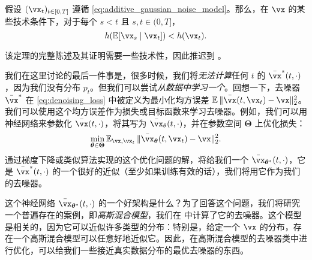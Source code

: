 \documentclass[../../book-main.tex]{subfiles}
\begin{document}
\begin{theorem}
	假设 \((\vx_{t})_{t \in [0, T]}\) 遵循 \eqref{eq:additive_gaussian_noise_model}。那么，在 \(\vx\) 的某些技术条件下，对于每个 \(s < t\) 且 \(s, t \in (0, T]\)，
	\begin{equation}
		h(\Ex[\vx_{s} \mid \vx_{t}]) < h(\vx_{t}).
	\end{equation}
\end{theorem}
该定理的完整陈述及其证明需要一些技术性，因此推迟到 。

我们在这里讨论的最后一件事是，很多时候，我们将\textit{无法计算}任何 \(t\) 的 \(\bar{\vx}^{\ast}(t, \cdot)\)，因为我们没有分布 \(p_{t}\)。但我们可以尝试\textit{从数据中学习一个}。回想一下，去噪器 \(\bar{\vx}^{\ast}\) 在 \eqref{eq:denoising_loss} 中被定义为最小化均方误差 \(\Ex\norm{\bar{\vx}(t, \vx_{t}) - \vx}_{2}^{2}\)。我们可以使用这个均方误差作为损失或目标函数来学习去噪器。例如，我们可以用神经网络来参数化 \(\bar{\vx}(t, \cdot)\)，将其写为 \(\bar{\vx}_{\theta}(t, \cdot)\)，并在参数空间 \(\bm\Theta\) 上优化损失：
\begin{equation}
	\min_{\bm \theta \in \bm \Theta}\Ex_{\vx, \vx_{t}}\norm{\bar{\vx}_{\bm\theta}(t, \vx_{t}) - \vx}_{2}^{2}.
\end{equation}
通过梯度下降或类似算法实现的这个优化问题的解，将给我们一个 \(\bar{\vx}_{\bm\theta^{\ast}}(t, \cdot)\)，它是 \(\bar{\vx}^{\ast}(t, \cdot)\) 的一个很好的近似（至少如果训练有效的话），我们将用它作为我们的去噪器。

这个神经网络 \(\bar{\vx}_{\bm\theta^{\ast}}(t, \cdot)\) 的一个好架构是什么？为了回答这个问题，我们将研究一个普遍存在的案例，即\textit{高斯混合模型}，我们在  中计算了它的去噪器。这个模型是相关的，因为它可以近似许多类型的分布：特别是，给定一个 \(\vx\) 的分布，存在一个高斯混合模型可以任意好地近似它。因此，在高斯混合模型的去噪器类中进行优化，可以给我们一些接近真实数据分布的最优去噪器的东西。
\end{document}
